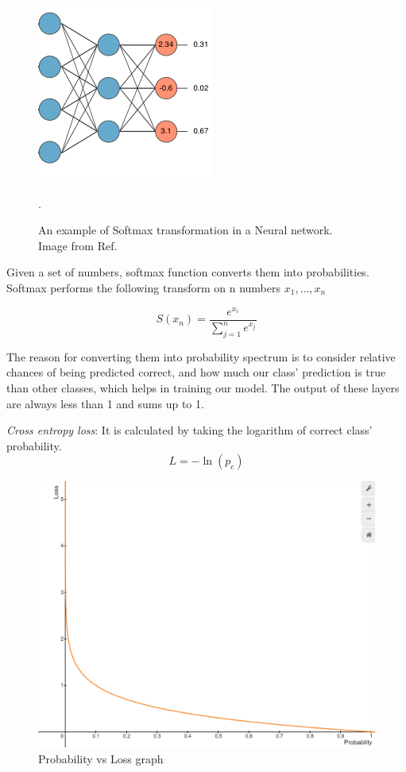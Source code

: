 \documentclass[conference]{IEEEtran}
\begin{document}
\begin{figure}[h]
  \centering
  \includegraphics[scale=0.5]{images/softmax_img.png}
  \caption{An example of Softmax transformation in a Neural network.\\Image from Ref. \cite{Smax_img_2020}}.
  \label{fig: softmax}
\end{figure}

Given a set of numbers, softmax function converts them into probabilities.
Softmax performs the following transform on n numbers \(x_1,\ldots,x_n\)


\begin{equation}
    S(x_n)=\frac{e^{x_i}}{\sum_{j=1}^n e^{x_j}}
\end{equation}


The reason for converting them into probability spectrum is to consider relative chances of being predicted correct, and how much our class' prediction is true than other classes, which helps in training our model. 
The output of these layers are always less than 1 and sums up to 1.

\emph{Cross entropy loss}:
It is calculated by taking the logarithm of correct class' probability.
\begin{equation}
    L = -\ln(p_c)
\end{equation}
\begin{figure}[h]
  \centering
  \includegraphics[scale=0.2]{images/Prob_graph.png}
  \caption{Probability vs Loss graph\cite{Desmos_Oct2021}}
  \label{fig:Probablity graph}
\end{figure}
\end{document}
